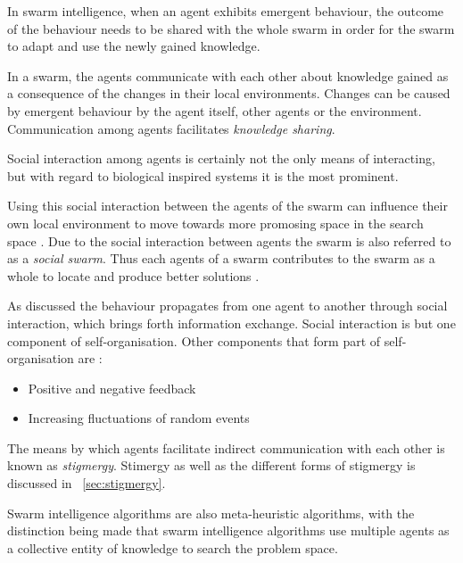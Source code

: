 In swarm intelligence, when an agent exhibits emergent behaviour, the outcome of the behaviour needs to be shared with the whole swarm in order for the swarm to adapt and use the newly gained knowledge\cite{SwarmArt,ChaoticSwarmIntel,CompuIntelligenceIntro,FundamentalSwarm}.

In a swarm, the agents communicate with each other about knowledge gained as a consequence of the changes in their local environments\cite{SwarmArt,ChaoticSwarmIntel,CompuIntelligenceIntro,FundamentalSwarm}. Changes can be caused by emergent behaviour by the agent itself, other agents or the environment\cite{SwarmArt,ChaoticSwarmIntel,CompuIntelligenceIntro,FundamentalSwarm}. Communication among agents facilitates \emph{knowledge sharing}\cite{SwarmArt,ChaoticSwarmIntel,CompuIntelligenceIntro,FundamentalSwarm}. 

Social interaction among agents is certainly not the only means of interacting, but with regard to biological inspired systems it is the most prominent\cite{CompuIntelligenceIntro}.

Using this social interaction between the agents of the swarm can influence their own local environment to move towards more promosing space in the search space \cite{SwarmArt,ChaoticSwarmIntel,CompuIntelligenceIntro,FundamentalSwarm}. Due to the social interaction between agents the swarm is also referred to as a \emph{social swarm}\cite{SwarmArt,ChaoticSwarmIntel,CompuIntelligenceIntro,FundamentalSwarm}. Thus each agents of a swarm contributes to the swarm as a whole to locate and produce better solutions \cite{BeeJobShop}. 

As discussed the behaviour propagates from one agent to another through social interaction, which brings forth information exchange\cite{SwarmArt}. Social interaction is but one component of self-organisation. Other components that form part of self-organisation are \cite{SIPowerInNums}:
\begin{itemize}
\item Positive and negative feedback\cite{SIPowerInNums}
\item Increasing fluctuations of random events\cite{SIPowerInNums}
\end{itemize}

The means by which agents facilitate indirect communication with each other is known as \emph{stigmergy}. Stimergy as well as the different forms of stigmergy is discussed in ~\ref{sec:stigmergy}.

Swarm intelligence algorithms are also meta-heuristic algorithms, with the distinction being made that swarm intelligence algorithms use multiple agents as a collective entity of knowledge to search the problem space\cite{SwarmArt,ChaoticSwarmIntel,BeeJobShop,CompuIntelligenceIntro,FundamentalSwarm}.

